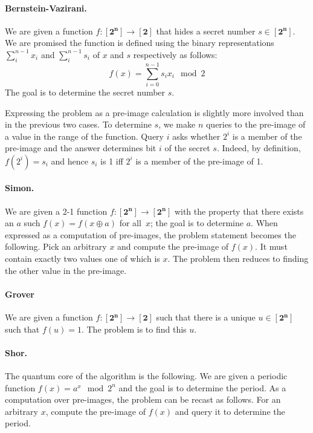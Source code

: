 \documentclass[sigplan,review]{acmart}
\newcommand{\finset}[1]{[\mathbf{#1}]}
\theoremstyle{definition}
\begin{document}
\paragraph*{Bernstein-Vazirani.}
We are given a function $f : \finset{2^n} \rightarrow \finset{2}$
that hides a secret number $s \in \finset{2^n}$. We are promised the
function is defined using the binary representations $\sum_i^{n-1}
x_i$ and $\sum_i^{n-1} s_i$ of $x$ and $s$ respectively as follows:
\[
f(x) = \sum_{i=0}^{n-1} s_ix_i \mod{2}
\]
The goal is to determine the secret number $s$. 

Expressing the problem as a pre-image calculation is slightly more
involved than in the previous two cases. To determine $s$, we make $n$
queries to the pre-image of a value in the range of the
function. Query $i$ asks whether $2^i$ is a member of the pre-image
and the answer determines bit $i$ of the secret $s$. Indeed, by
definition, $f(2^i) = s_i$ and hence $s_i$ is 1 iff $2^i$ is a member
of the pre-image of 1.

\paragraph*{Simon.}
We are given a 2-1 function $f : \finset{2^n} \rightarrow
\finset{2^n}$ with the property that there exists an $a$ such $f(x) =
f(x \oplus a)$ for all~$x$; the goal is to determine $a$. When
expressed as a computation of pre-images, the problem statement
becomes the following. Pick an arbitrary $x$ and compute the pre-image
of $f(x)$. It must contain exactly two values one of which is $x$. The
problem then reduces to finding the other value in the pre-image.

\paragraph*{Grover}
We are given a function $f : \finset{2^n} \rightarrow \finset{2}$
such that there is a unique $u \in \finset{2^n}$ such that $f(u)=1$.
The problem is to find this $u$.

\paragraph*{Shor.}
The quantum core of the algorithm is the following. We are given a
periodic function $f(x) = a^x \mod{2^n}$ and the goal is to determine
the period. As a computation over pre-images, the problem can be
recast as follows. For an arbitrary $x$, compute the pre-image of
$f(x)$ and query it to determine the period.
\end{document}
